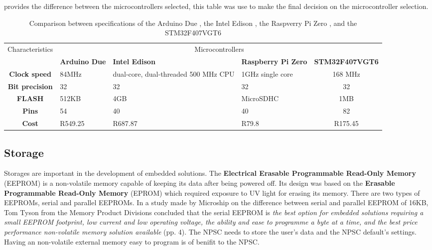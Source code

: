  provides the difference between the microcontrollers selected, this table was use to make the final decision on the microcontroller selection.
\begin{table}[h!]
\centering
\begin{tabular}{cp{5em}p{8em}p{5em}c}
\hline
\hline
\multirow{2}{*}{Characteristics}  & \multicolumn{4}{c}{Microcontrollers} \\  
 & \textbf{Arduino Due} & \textbf{Intel Edison} & \textbf{Raspberry Pi Zero} & \textbf{STM32F407VGT6} \\
\hline
\textbf{Clock speed} & 84MHz &  dual-core, dual-threaded 500 MHz CPU & 1GHz single core & 168 MHz\\
\textbf{Bit precision} & 32 & 32 & 32 & 32 \\
\textbf{FLASH} & 512KB & 4GB & MicroSDHC & 1MB \\
\textbf{Pins} & 54 & 40 & 40 & 82\\
\textbf{Cost} & R549.25 & R687.87 & R79.8 & R175.45\\
\hline
\hline
\end{tabular}
\caption{Comparison between specifications of the Arduino Due \cite{arduino}, the Intel Edison \cite{intel}, the Raspverry Pi Zero \cite{raspberry}, and the STM32F407VGT6\cite{stm}}
\label{table:micro}
\end{table}

\subsection{Storage}
Storages are important in the development of embedded solutions. The \textbf{Electrical Erasable Programmable Read-Only Memory} (EEPROM) is a non-volatile memory capable of keeping its data after being powered off. Its design was based on the \textbf{Erasable Programmable Read-Only Memory} (EPROM) which required exposure to UV light for erasing its memory. There are two types of EEPROMs, serial and parallel EEPROMs. In a study made by Microship on the difference between serial and parallel EEPROM of 16KB, Tom Tyson from the Memory Product Divisions concluded that the serial EEPROM is \textit{the best option for embedded solutions requiring a small EEPROM footprint, low current and low operating voltage, the ability and ease to programme a byte at a time, and the best price performance non-volatile memory solution available}\cite{serialvsparallel} (pp. 4).
The NPSC needs to store the user's data and the NPSC default's settings. Having an non-volatile external memory easy to program is of benifit to the NPSC.

